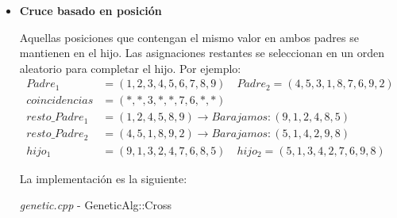 \documentclass[a4paper, 12pt]{article}
\begin{document}
      \begin{itemize}
      	\newpage
      	\item \textbf{Cruce basado en posición}
      	
      	Aquellas posiciones que contengan el mismo valor en ambos padres se mantienen en el hijo. Las asignaciones restantes se seleccionan en un orden aleatorio para completar el hijo. Por ejemplo:
		\begin{align*}
		Padre_1 &= (1, 2, 3, 4, 5, 6, 7, 8, 9) \quad Padre_2 = (4, 5, 3, 1, 8, 7, 6, 9, 2)\\
		coincidencias &= (*, *, 3, *, *, 7, 6, *, *)\\
		resto\_Padre_1 &= (1,2,4,5,8,9) \rightarrow Barajamos: (9,1,2,4,8,5)\\
		resto\_Padre_2 &= (4,5,1,8,9,2) \rightarrow Barajamos: (5,1,4,2,9,8)\\
		hijo_1 &= (9,1,3,2,4,7,6,8,5)\quad hijo_2 = (5,1,3,4,2,7,6,9,8)
		\end{align*}
		
		La implementación es la siguiente:\\
		\begin{algorithm}[H]
       	\caption{\textit{genetic.cpp} - GeneticAlg::Cross}
       	
\end{algorithm}
\end{itemize}
\end{document}
